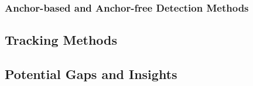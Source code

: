 
\subsubsection{Anchor-based and Anchor-free Detection Methods}


\subsection{Tracking Methods}


\subsection{Potential Gaps and Insights}




